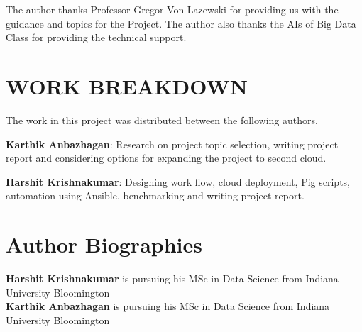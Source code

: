 \documentclass[9pt,twocolumn,twoside]{../../styles/osajnl}
\begin{document}
The author thanks Professor Gregor Von Lazewski for providing us with the guidance and topics for the Project. The author also thanks the AIs of Big Data Class for providing the technical
support.




\section*{WORK BREAKDOWN}
	The work in this project was distributed between the following authors.
	
	\textbf{Karthik Anbazhagan}: Research on project topic selection, writing project report and considering options for expanding the project to second cloud.
	
	\textbf{Harshit Krishnakumar}: Designing work flow, cloud deployment, Pig scripts, automation using Ansible, benchmarking and writing project report.

\section*{Author Biographies}
\begingroup
\setlength\intextsep{0pt}
\begin{minipage}[t][3.2cm][t]{1.0\columnwidth} %
{\bfseries Harshit Krishnakumar} is pursuing his MSc in Data Science from
Indiana University Bloomington\\
{\bfseries Karthik Anbazhagan} is pursuing his MSc in Data Science from
Indiana University Bloomington
\end{minipage}
\endgroup
\end{document}
